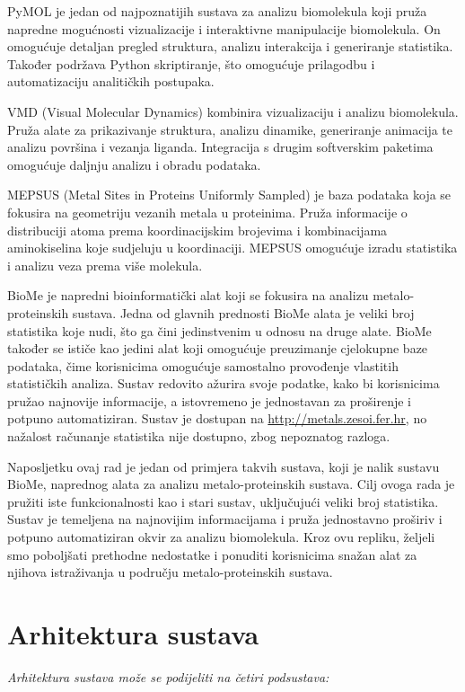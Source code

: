 \documentclass[times, utf8, zavrsni]{fer}
\begin{document}
PyMOL \cite{pymol} je jedan od najpoznatijih sustava za analizu biomolekula koji pruža napredne mogućnosti vizualizacije i interaktivne manipulacije biomolekula. 
On omogućuje detaljan pregled struktura, analizu interakcija i generiranje statistika. Također podržava Python skriptiranje, što omogućuje prilagodbu i automatizaciju analitičkih postupaka.

VMD (Visual Molecular Dynamics) \cite{vmd} kombinira vizualizaciju i analizu biomolekula. 
Pruža alate za prikazivanje struktura, analizu dinamike, generiranje animacija te analizu površina i vezanja liganda.
 Integracija s drugim softverskim paketima omogućuje daljnju analizu i obradu podataka.


MEPSUS (Metal Sites in Proteins Uniformly Sampled)  \cite{mepsus} je baza podataka koja se fokusira na geometriju vezanih metala u proteinima.
 Pruža informacije o distribuciji atoma prema koordinacijskim brojevima i kombinacijama aminokiselina koje sudjeluju u koordinaciji.
 MEPSUS omogućuje izradu statistika i analizu veza prema više molekula.

BioMe \cite{rakipovic} je napredni bioinformatički alat koji se fokusira na analizu metalo-proteinskih sustava. Jedna od glavnih prednosti BioMe alata je veliki broj statistika koje nudi, što ga čini jedinstvenim u odnosu na druge alate. 
BioMe također se ističe kao jedini alat koji omogućuje preuzimanje cjelokupne baze podataka, čime korisnicima omogućuje samostalno provođenje vlastitih statističkih analiza.
Sustav redovito ažurira svoje podatke, kako bi korisnicima pružao najnovije informacije, a istovremeno je jednostavan za proširenje i potpuno automatiziran.
Sustav je dostupan na \url{http://metals.zesoi.fer.hr}, no nažalost računanje statistika nije dostupno, zbog nepoznatog razloga.

Naposljetku ovaj rad je jedan od primjera takvih sustava, koji je nalik sustavu BioMe, naprednog alata za analizu metalo-proteinskih sustava.
Cilj ovoga rada je pružiti iste funkcionalnosti kao i stari sustav, uključujući veliki broj statistika.
Sustav je temeljena na najnovijim informacijama i pruža jednostavno proširiv i potpuno automatiziran okvir za analizu biomolekula. 
Kroz ovu repliku, željeli smo poboljšati prethodne nedostatke i ponuditi korisnicima snažan alat za njihova istraživanja u području metalo-proteinskih sustava.

\chapter{Arhitektura sustava}
 \textit{Arhitektura sustava može se podijeliti  na četiri podsustava: }
\end{document}

